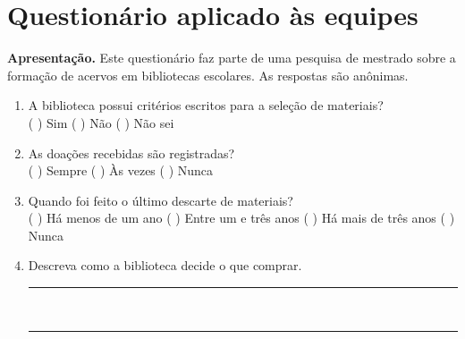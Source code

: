 \chapter{Questionário aplicado às equipes}
\label{ap:questionario}


\textbf{Apresentação.} Este questionário faz parte de uma pesquisa de mestrado sobre a formação de acervos em bibliotecas escolares. As respostas são anônimas.

\begin{enumerate}[label=\arabic*.]
  \item A biblioteca possui critérios escritos para a seleção de materiais?\\
    ( ) Sim \quad ( ) Não \quad ( ) Não sei
  \item As doações recebidas são registradas?\\
    ( ) Sempre \quad ( ) Às vezes \quad ( ) Nunca
  \item Quando foi feito o último descarte de materiais?\\
    ( ) Há menos de um ano \quad ( ) Entre um e três anos \quad ( ) Há mais de três anos \quad ( ) Nunca
  \item Descreva como a biblioteca decide o que comprar.\\[0.5em]
    \rule{\linewidth}{0.4pt}\\[0.8em]\rule{\linewidth}{0.4pt}
\end{enumerate}
